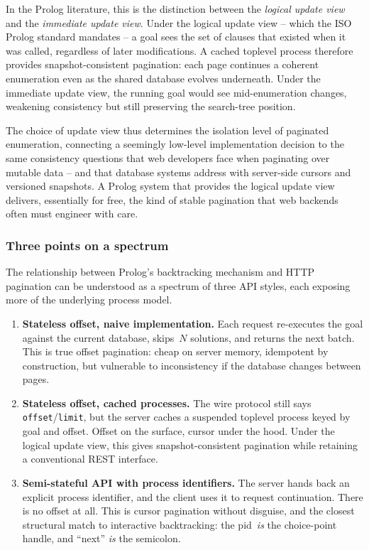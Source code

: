 In the Prolog literature, this is the distinction between the
\emph{logical update view} and the \emph{immediate update view}.
Under the logical update view -- which the ISO Prolog standard mandates -- a goal sees the set of clauses that existed when it was called, regardless of later modifications. A cached toplevel process
therefore provides snapshot-consistent pagination: each page
continues a coherent enumeration even as the shared database evolves
underneath. Under the immediate update view, the running goal would
see mid-enumeration changes, weakening consistency but still
preserving the search-tree position.

The choice of update view thus determines the isolation level of
paginated enumeration, connecting a seemingly low-level
implementation decision to the same consistency questions that web
developers face when paginating over mutable data -- and that
database systems address with server-side cursors and versioned
snapshots. A Prolog system that provides the logical update view
delivers, essentially for free, the kind of stable pagination that
web backends often must engineer with care.


\subsubsection{Three points on a spectrum}

The relationship between Prolog's backtracking mechanism and HTTP
pagination can be understood as a spectrum of three API styles, each
exposing more of the underlying process model.

\begin{enumerate}
\item \textbf{Stateless offset, naive implementation.} Each request
  re-executes the goal against the current database, skips~$N$
  solutions, and returns the next batch. This is true offset
  pagination: cheap on server memory, idempotent by construction, but
  vulnerable to inconsistency if the database changes between pages.

\item \textbf{Stateless offset, cached processes.} The wire protocol
  still says \texttt{offset}/\texttt{limit}, but the server caches a
  suspended toplevel process keyed by goal and offset. Offset on the
  surface, cursor under the hood. Under the logical update view, this
  gives snapshot-consistent pagination while retaining a conventional
  REST interface.

\item \textbf{Semi-stateful API with process identifiers.} The
  server hands back an explicit process identifier, and the client
  uses it to request continuation. There is no offset at all. This is
  cursor pagination without disguise, and the closest structural
  match to interactive backtracking: the pid~\emph{is} the
  choice-point handle, and ``next'' \emph{is} the semicolon.
\end{enumerate}

